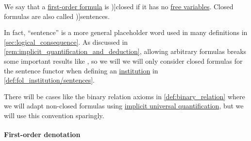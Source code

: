 \begin{definition}\label{def:fol_closed_formula}
  We say that a \hyperref[def:fol_formula]{first-order formula} is \term[ru=замкнутая формула (\cite[61]{КолмогоровДрагалин2006ЛогикаВведение})]{closed} if it has no \hyperref[def:fol_variable_freeness]{free variables}. Closed formulas are also called \term[ru=предложения (\cite[61]{КолмогоровДрагалин2006ЛогикаВведение})]{sentences}.
\end{definition}
\begin{comments}
  \item In fact, \enquote{sentence} is a more general placeholder word used in many definitions in \cref{sec:logical_consequence}. As discussed in \cref{rem:implicit_quantification_and_deduction}, allowing arbitrary formulas breaks some important results like , so we will we will only consider closed formulas for the sentence functor when defining an \hyperref[def:institution]{institution} in \cref{def:fol_institution/sentences}.

  There will be cases like the binary relation axioms in \cref{def:binary_relation} where we will adapt non-closed formulas using \hyperref[def:fol_implicit_universal_quantification]{implicit universal quantification}, but we will use this convention sparingly.
\end{comments}

\paragraph{First-order denotation}

